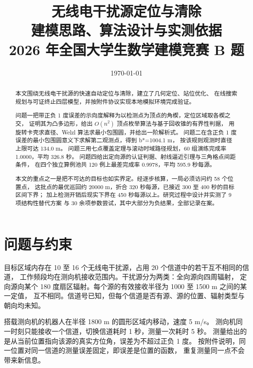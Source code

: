 

\title{\heiti 无线电干扰源定位与清除\\[6pt]
       \large 建模思路、算法设计与实测依据\\[4pt]
       \normalsize 2026 年全国大学生数学建模竞赛 B 题}
\author{}
\date{\today}


\maketitle
\thispagestyle{fancy}

\begin{abstract}
\noindent
本文围绕无线电干扰源的快速自动定位与清除，建立了几何定位、站位优化、
在线搜索规划与可证终止四层模型，并按附件协议实现本地模拟环境完成验证。

问题一把带正负 1 度误差的示向度解释为以检测点为顶点的角楔，定位区域取各楔之交，
证明其为凸多边形，给出 $O(n^2)$ 顶点枚举算法与基于回收锥的有界性判据，
用旋转卡壳求直径、Welzl 算法求最小包围圆，并给出一阶解析式。
问题二在含正负 1 度误差的最小包围圆意义下求解第二观测点，得到 b*=1004.1 m，
按该规则观测时直径上限可达 134.0 m。
问题三用七点覆盖定理与滚动时域路径规划，60 组演练完成率 1.0000，平均 326.8 秒。
问题四给出定向源的认证判据、射线逼近引理与三角格点间距条件，
在四个独立算例池共 120 例上最差完成率 0.9978，平均 595.9 秒每源。

本文的重点之一是把不可达的目标也如实界定。经逐步核算，一局必须访问约 58 个位置点，
这批点的最优巡回约 20000 m，折合 320 秒每源，已接近 300 至 400 秒的目标区间下界；
加上检测开销后现实下界在 450 秒每源以上。研究过程中设计并实测了 9 项结构性替代方案
与 30 余项参数尝试，其中大部分为负结果，全部记录在案。
\end{abstract}

\tableofcontents
\newpage

\section{问题与约束}

目标区域内存在 10 至 16 个无线电干扰源，占用 20 个信道中的若干互不相同的信道，
工作频段均在测向机接收范围内。干扰源分为两类：全向源向四周辐射，
定向源向某个 180 度扇区辐射。每个源的有效接收半径为 1000 至 1500 m 之间的某一定值，
互不相同。信道号已知，但每个信道是否有源、源的位置、辐射类型与朝向均未知。

搭载测向机的机器人在半径 1800 m 的圆形区域内移动，速度 5 m/s。
测向机同一时刻只能接收一个信道，切换信道耗时 1 秒，测量一次耗时 5 秒。
测量给出的是从当前位置指向该源的真实方位角，误差为不超过正负 1 度。
按附件说明，同一位置对同一信道的测量误差固定，即误差是位置的函数，
重复测量同一点不会带来新信息。

